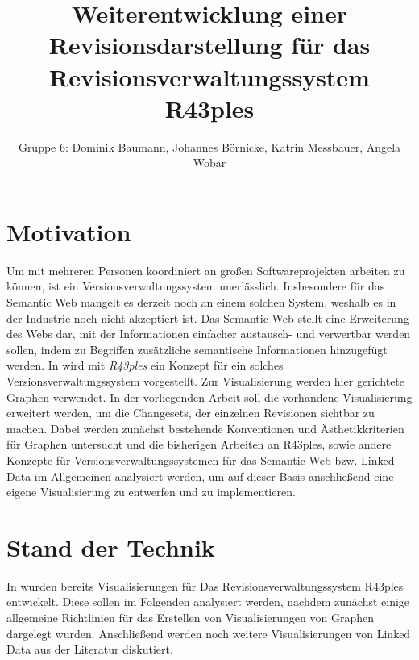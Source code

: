 \documentclass[color]{tudbook}
\begin{document}
\author{Gruppe 6: Dominik Baumann, Johannes Börnicke, Katrin Messbauer, Angela Wobar}
\title{Weiterentwicklung einer Revisionsdarstellung für das Revisionsverwaltungssystem R43ples}
\maketitle

\tableofcontents

\chapter{Motivation}
Um mit mehreren Personen koordiniert an großen Softwareprojekten arbeiten zu können, ist ein Versionsverwaltungssystem unerlässlich. Insbesondere für das Semantic Web mangelt es derzeit noch an einem solchen System, weshalb es in der Industrie noch nicht akzeptiert ist. Das Semantic Web stellt eine Erweiterung des Webs dar, mit der Informationen einfacher austausch- und verwertbar werden sollen, indem zu Begriffen zusätzliche semantische Informationen hinzugefügt werden. In \cite{Graube} wird mit \textit{R43ples} ein Konzept für ein solches Versionsverwaltungssystem vorgestellt. Zur Visualisierung werden hier gerichtete Graphen verwendet. In der vorliegenden Arbeit soll die vorhandene Visualisierung erweitert werden, um die Changesets, der einzelnen Revisionen sichtbar zu machen. Dabei werden zunächst bestehende Konventionen und Ästhetikkriterien für Graphen untersucht und die bisherigen Arbeiten an R43ples, sowie andere Konzepte für Versionsverwaltungssystemen für das Semantic Web bzw. Linked Data im Allgemeinen analysiert werden, um auf dieser Basis anschließend eine eigene Visualisierung zu entwerfen und zu implementieren.

\chapter{Stand der Technik}
In \cite{Gruppe2.3,Gruppe2.1} wurden bereits Visualisierungen für Das Revisionsverwaltungssystem R43ples entwickelt. Diese sollen im Folgenden analysiert werden, nachdem zunächst einige allgemeine Richtlinien für das Erstellen von Visualisierungen von Graphen dargelegt wurden. Anschließend werden noch weitere Visualisierungen von Linked Data aus der Literatur diskutiert.
\end{document}
